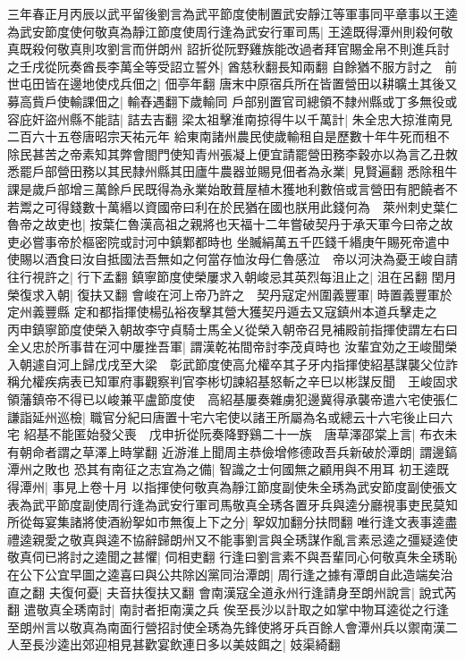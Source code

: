 三年春正月丙辰以武平留後劉言為武平節度使制置武安靜江等軍事同平章事以王逵為武安節度使何敬真為靜江節度使周行逢為武安行軍司馬|{
	王逵既得潭州則殺何敬真既殺何敬真則攻劉言而併朗州}
詔折從阮野雞族能改過者拜官賜金帛不則進兵討之壬戌從阮奏酋長李萬全等受詔立誓外|{
	酋慈秋翻長知兩翻}
自餘猶不服方討之　前世屯田皆在邊地使戍兵佃之|{
	佃亭年翻}
唐末中原宿兵所在皆置營田以耕曠土其後又募高貲戶使輸課佃之|{
	輸舂遇翻下歲輸同}
戶部别置官司總領不隸州縣或丁多無役或容庇奸盜州縣不能詰|{
	詰去吉翻}
梁太祖擊淮南掠得牛以千萬計|{
	朱全忠大掠淮南見二百六十五卷唐昭宗天祐元年}
給東南諸州農民使歲輸租自是歷數十年牛死而租不除民甚苦之帝素知其弊會閤門使知青州張凝上便宜請罷營田務李穀亦以為言乙丑敇悉罷戶部營田務以其民隸州縣其田廬牛農器並賜見佃者為永業|{
	見賢遍翻}
悉除租牛課是歲戶部增三萬餘戶民既得為永業始敢葺屋植木獲地利數倍或言營田有肥饒者不若鬻之可得錢數十萬緡以資國帝曰利在於民猶在國也朕用此錢何為　萊州刺史葉仁魯帝之故吏也|{
	按葉仁魯漢高祖之親將也天福十二年嘗破契丹于承天軍今曰帝之故吏必嘗事帝於樞密院或討河中鎮鄴都時也}
坐贓絹萬五千匹錢千緡庚午賜死帝遣中使賜以酒食曰汝自抵國法吾無如之何當存恤汝母仁魯感泣　帝以河決為憂王峻自請往行視許之|{
	行下孟翻}
鎮寧節度使榮屢求入朝峻忌其英烈每沮止之|{
	沮在呂翻}
閏月榮復求入朝|{
	復扶又翻}
會峻在河上帝乃許之　契丹寇定州圍義豐軍|{
	時置義豐軍於定州義豐縣}
定和都指揮使楊弘裕夜擊其營大獲契丹遁去又寇鎮州本道兵擊走之　丙申鎮寧節度使榮入朝故李守貞騎士馬全乂從榮入朝帝召見補殿前指揮使謂左右曰全乂忠於所事昔在河中屢挫吾軍|{
	謂漢乾祐間帝討李茂貞時也}
汝輩宜効之王峻聞榮入朝遽自河上歸戊戌至大梁　彰武節度使高允權卒其子牙内指揮使紹基謀襲父位詐稱允權疾病表已知軍府事觀察判官李彬切諫紹基怒斬之辛巳以彬謀反聞　王峻固求領藩鎮帝不得已以峻兼平盧節度使　高紹基屢奏雜虜犯邊冀得承襲帝遣六宅使張仁謙詣延州巡檢|{
	職官分紀曰唐置十宅六宅使以諸王所屬為名或總云十六宅後止曰六宅}
紹基不能匿始發父喪　戊申折從阮奏降野鷄二十一族　唐草澤邵棠上言|{
	布衣未有朝命者謂之草澤上時掌翻}
近游淮上聞周主恭儉增修德政吾兵新破於潭朗|{
	謂邊鎬潭州之敗也}
恐其有南征之志宜為之備|{
	智識之士何國無之顧用與不用耳}
初王逵既得潭州|{
	事見上卷十月}
以指揮使何敬真為靜江節度副使朱全琇為武安節度副使張文表為武平節度副使周行逢為武安行軍司馬敬真全琇各置牙兵與逵分廳視事吏民莫知所從每宴集諸將使酒紛挐如市無復上下之分|{
	挐奴加翻分扶問翻}
唯行逢文表事逵盡禮逵親愛之敬真與逵不協辭歸朗州又不能事劉言與全琇謀作亂言素忌逵之彊疑逵使敬真伺已將討之逵聞之甚懼|{
	伺相吏翻}
行逢曰劉言素不與吾輩同心何敬真朱全琇恥在公下公宜早圖之逵喜曰與公共除凶黨同治潭朗|{
	周行逢之據有潭朗自此造端矣治直之翻}
夫復何憂|{
	夫音扶復扶又翻}
會南漢寇全道永州行逢請身至朗州說言|{
	說式芮翻}
遣敬真全琇南討|{
	南討者拒南漢之兵}
俟至長沙以計取之如掌中物耳逵從之行逢至朗州言以敬真為南面行營招討使全琇為先鋒使將牙兵百餘人會潭州兵以禦南漢二人至長沙逵出郊迎相見甚歡宴飲連日多以美妓餌之|{
	妓渠綺翻}
